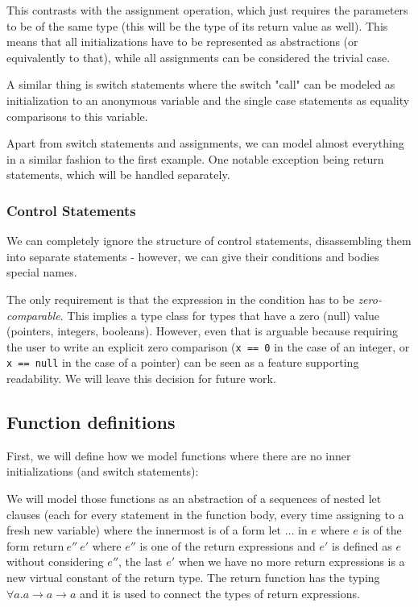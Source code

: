 This contrasts with the assignment operation, which just requires the parameters to be of the same type (this will be the type of its return value as well). This means that all initializations have to be represented as abstractions (or equivalently to that), while all assignments can be considered the trivial case.

A similar thing is switch statements where the switch "call" can be modeled as initialization to an anonymous variable and the single case statements as equality comparisons to this variable.

Apart from switch statements and assignments, we can model almost everything in a similar fashion to the first example. One notable exception being return statements, which will be handled separately.

\subsubsection{Control Statements}

We can completely ignore the structure of control statements, disassembling them into separate statements - however, we can give their conditions and bodies special names.

The only requirement is that the expression in the condition has to be \emph{zero-comparable}. This implies a type class for types that have a zero (null) value (pointers, integers, booleans). However, even that is arguable because requiring the user to write an explicit zero comparison (\lstinline{x == 0} in the case of an integer, or \lstinline{x == null} in the case of a pointer) can be seen as a feature supporting readability. We will leave this decision for future work.

\subsection{Function definitions}

First, we will define how we model functions where there are no inner initializations (and switch statements):

We will model those functions as an abstraction of a sequences of nested $\text{let}$ clauses (each for every statement in the function body, every time assigning to a fresh new variable) where the innermost is of a form $\text{let } \dots \text{ in } e$ where $e$ is of the form $\text{return}\ e''\ e'$ where $e''$ is one of the return expressions and $e'$ is defined as $e$ without considering $e''$, the last $e'$ when we have no more return expressions is a new virtual constant of the return type. The $\text{return}$ function has the typing $\forall a . a \rightarrow a \rightarrow a$ and it is used to connect the types of return expressions.

